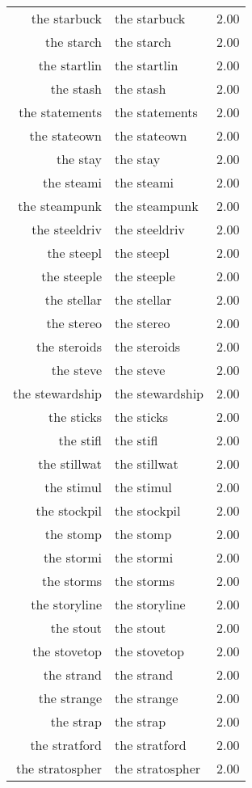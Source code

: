 \begin{table}[ht]
\begin{tabular}{rlr}
  the starbuck & the starbuck & 2.00 \\ 
  the starch & the starch & 2.00 \\ 
  the startlin & the startlin & 2.00 \\ 
  the stash & the stash & 2.00 \\ 
  the statements & the statements & 2.00 \\ 
  the stateown & the stateown & 2.00 \\ 
  the stay & the stay & 2.00 \\ 
  the steami & the steami & 2.00 \\ 
  the steampunk & the steampunk & 2.00 \\ 
  the steeldriv & the steeldriv & 2.00 \\ 
  the steepl & the steepl & 2.00 \\ 
  the steeple & the steeple & 2.00 \\ 
  the stellar & the stellar & 2.00 \\ 
  the stereo & the stereo & 2.00 \\ 
  the steroids & the steroids & 2.00 \\ 
  the steve & the steve & 2.00 \\ 
  the stewardship & the stewardship & 2.00 \\ 
  the sticks & the sticks & 2.00 \\ 
  the stifl & the stifl & 2.00 \\ 
  the stillwat & the stillwat & 2.00 \\ 
  the stimul & the stimul & 2.00 \\ 
  the stockpil & the stockpil & 2.00 \\ 
  the stomp & the stomp & 2.00 \\ 
  the stormi & the stormi & 2.00 \\ 
  the storms & the storms & 2.00 \\ 
  the storyline & the storyline & 2.00 \\ 
  the stout & the stout & 2.00 \\ 
  the stovetop & the stovetop & 2.00 \\ 
  the strand & the strand & 2.00 \\ 
  the strange & the strange & 2.00 \\ 
  the strap & the strap & 2.00 \\ 
  the stratford & the stratford & 2.00 \\ 
  the stratospher & the stratospher & 2.00 \\ 

\end{tabular}
\end{table}
